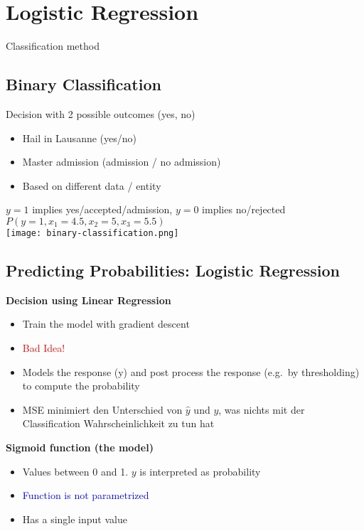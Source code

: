 \section{Logistic Regression}
Classification method

\subsection{Binary Classification}
Decision with 2 possible outcomes (yes, no)

\begin{itemize}
    \item Hail in Lausanne (yes/no)
    \item Master admission (admission / no admission)
    \item Based on different data / entity
\end{itemize}
$y = 1$ implies yes/accepted/admission, $y = 0$ implies no/rejected \\
$P(y = 1, x_1 = 4.5, x_2 = 5, x_3 = 5.5)$\\

\texttt{[image: binary-classification.png]}

\subsection{Predicting Probabilities: Logistic Regression}

\textbf{Decision using Linear Regression}
\begin{itemize}
    \item Train the model with gradient descent
    \item \textcolor{red}{Bad Idea!}
    \item Models the response (y) and post process the response (e.g.\ by thresholding) to compute the probability
    \item MSE minimiert den Unterschied von $\hat{y}$ und $y$, was nichts mit der Classification Wahrscheinlichkeit zu tun hat
\end{itemize}
\vspace{10pt}
\textbf{Sigmoid function (the model)}

\begin{itemize}
    \item Values between 0 and 1. $y$ is interpreted as probability
    \item \textcolor{blue}{Function is not parametrized}
    \item Has a single input value
\end{itemize}

